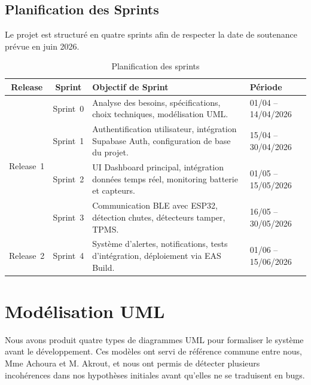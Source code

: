 \documentclass[12pt, a4paper]{report}
\begin{document}
\subsection{Planification des Sprints}

Le projet est structuré en quatre sprints afin de respecter la date de soutenance
prévue en juin 2026.

\begin{table}[H]
  \centering
  \caption{Planification des sprints}
  \label{tab:sprints}
  \renewcommand{\arraystretch}{1.5}
  \small
  \begin{tabularx}{\textwidth}{|c|c|X|p{3.5cm}|}
    \hline
    \rowcolor{isimablue!20}
    \textbf{Release} & \textbf{Sprint} & \textbf{Objectif de Sprint} & \textbf{Période} \\
    \hline
    \multirow{4}{*}{Release~1}
      & Sprint~0 & Analyse des besoins, spécifications, choix techniques, modélisation UML. & 01/04 -- 14/04/2026 \\
    \cline{2-4}
      & Sprint~1 & Authentification utilisateur, intégration Supabase Auth, configuration de base du projet. & 15/04 -- 30/04/2026 \\
    \cline{2-4}
      & Sprint~2 & UI Dashboard principal, intégration données temps réel, monitoring batterie et capteurs. & 01/05 -- 15/05/2026 \\
    \cline{2-4}
      & Sprint~3 & Communication BLE avec ESP32, détection chutes, détecteurs tamper, TPMS. & 16/05 -- 30/05/2026 \\
    \hline
    Release~2
      & Sprint~4 & Système d'alertes, notifications, tests d'intégration, déploiement via EAS Build. & 01/06 -- 15/06/2026 \\
    \hline
  \end{tabularx}
\end{table}

\section{Modélisation UML}

Nous avons produit quatre types de diagrammes UML pour formaliser le système avant le
développement. Ces modèles ont servi de référence commune entre nous, Mme Achoura et
M. Akrout, et nous ont permis de détecter plusieurs incohérences dans nos hypothèses
initiales avant qu'elles ne se traduisent en bugs.
\end{document}
